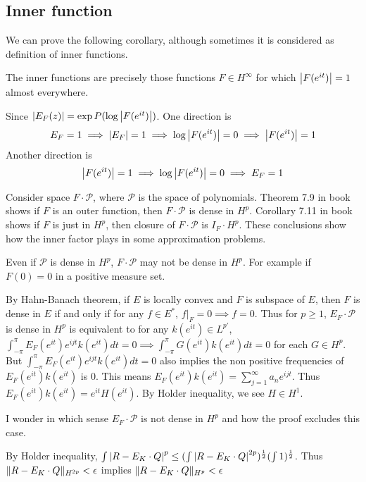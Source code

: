 \subsection{Inner function}
We can prove the following corollary, although sometimes it is considered as definition of inner functions.
\begin{corollary}
    The inner functions are precisely those functions $F\in H^\infty$ for which $\left\lvert F(e^{it})\right\rvert=1$ almost everywhere.
\end{corollary}
\begin{remark}
    Since $\left\lvert E_F(z)\right\rvert=\exp{P(\log\left\lvert F(e^{it})\right\rvert)}$. One direction is
    \begin{equation*}
        E_F=1\implies\left\lvert E_F\right\rvert=1\implies\log{\left\lvert F(e^{it})\right\rvert}=0\implies\left\lvert F(e^{it})\right\rvert=1
    \end{equation*}
    Another direction is
    \begin{equation*}
        \left\lvert F(e^{it})\right\rvert=1  \implies\log{\left\lvert F(e^{it})\right\rvert}=0\implies E_F=1
    \end{equation*}
\end{remark}
Consider space $F\cdot\mathscr{P}$, where $\mathscr{P}$ is the space of polynomials. Theorem 7.9 in book shows if $F$ is an outer function, then $F\cdot\mathscr{P}$ is dense
in $H^p$. Corollary 7.11 in book shows if $F$ is just in $H^p$, then closure of $F\cdot\mathscr{P}$ is $I_F\cdot H^p$. These conclusions show how the inner factor plays in some approximation problems.
\begin{remark}
    Even if $\mathscr{P}$ is dense in $H^p$, $F\cdot\mathscr{P}$ may not be dense in $H^p$. For example if $F(0)=0$ in a positive measure set.\par
    By Hahn-Banach theorem, if $E$ is locally convex and $F$ is subspace of $E$, then $F$ is dense in $E$ if and only if for
    any $f\in E^*$, $f\vert_F=0 \implies f=0$. Thus for $p\geq 1$, $E_F\cdot\mathscr{P}$ is dense in $H^p$ is equivalent to
    for any $k(e^{it})\in L^{p'}$, $\int_{-\pi}^{\pi}E_F(e^{it})e^{ijt}k(e^{it})dt=0\implies\int_{-\pi}^{\pi}G(e^{it})k(e^{it})dt=0$ for each $G\in H^p$.
    But $\int_{-\pi}^{\pi}E_F(e^{it})e^{ijt}k(e^{it})dt=0$ also implies the non positive frequencies of $E_F(e^{it})k(e^{it})$ is 0. This means $E_F(e^{it})k(e^{it})=\sum_{j=1}^\infty{a_ne^{ijt}}$.
    Thus $E_F(e^{it})k(e^{it})=e^{it}H(e^{it})$. By Holder inequality, we see $H\in H^1$.\par 
    {\color{blue}I wonder in which sense $E_F\cdot\mathscr{P}$ is not dense in $H^p$ and how the proof excludes this case}.\par
    By Holder inequality, $\int\left\lvert R-E_K\cdot Q\right\rvert^p\leq(\int\left\lvert R-E_K\cdot Q\right\rvert^{2p})^\frac{1}{2}(\int 1)^\frac{1}{2}$. Thus $\lVert R-E_K\cdot Q\rVert_{H^{2p}}<\epsilon$ implies $\lVert R-E_K\cdot Q\rVert_{H^{p}}<\epsilon$  
\end{remark}
% 